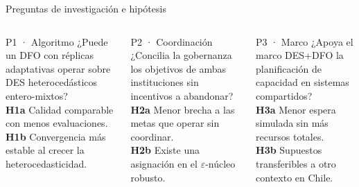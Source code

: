 \documentclass[aspectratio=169,11pt,xcolor=table]{beamer}
\begin{document}
\begin{frame}{Preguntas de investigación e hipótesis}
  \small
  \begin{columns}[T]
      \begin{block}{P1 · Algoritmo}
        ¿Puede un DFO con réplicas adaptativas operar sobre DES heterocedásticos
        entero-mixtos?\\[4pt]
        \textbf{H1a} Calidad comparable con menos evaluaciones.\\
        \textbf{H1b} Convergencia más estable al crecer la heterocedasticidad.
      \end{block}
      \begin{block}{P2 · Coordinación}
        ¿Concilia la gobernanza los objetivos de ambas instituciones sin incentivos
        a abandonar?\\[4pt]
        \textbf{H2a} Menor brecha a las metas que operar sin coordinar.\\
        \textbf{H2b} Existe una asignación en el $\varepsilon$-núcleo robusto.
      \end{block}
      \begin{block}{P3 · Marco}
        ¿Apoya el marco DES+DFO la planificación de capacidad en sistemas compartidos?\\[4pt]
        \textbf{H3a} Menor espera simulada sin más recursos totales.\\
        \textbf{H3b} Supuestos transferibles a otro contexto en Chile.
      \end{block}
  \end{columns}
\end{frame}
\end{document}
